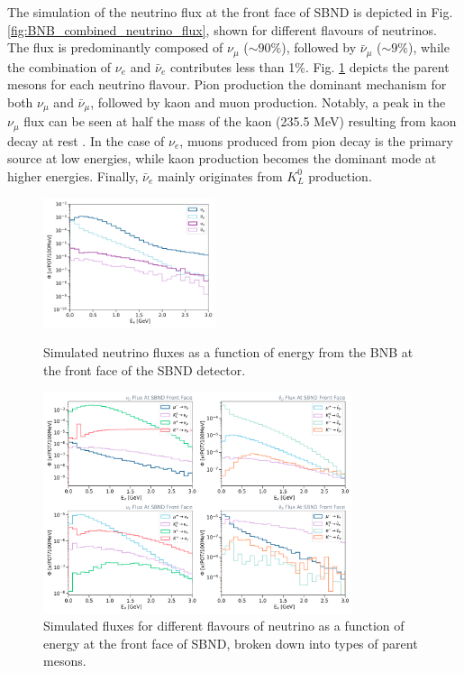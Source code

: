 The simulation of the neutrino flux at the front face of SBND is depicted in Fig. \ref{fig:BNB_combined_neutrino_flux}, shown for different flavours of neutrinos. 
The flux is predominantly composed of $\nu_{\mu}$ ($\sim90\%$), followed by $\bar{\nu}_{\mu}$ ($\sim9\%$), while the combination of $\nu_{e}$ and $\bar{\nu}_{e}$ contributes less than 1\%.
Fig. \ref{fig:BNB_neutrino_flux} depicts the parent mesons for each neutrino flavour.
Pion production the dominant mechanism for both $\nu_{\mu}$ and $\bar{\nu}_{\mu}$, followed by kaon and muon production. 
Notably, a peak in the $\nu_{\mu}$ flux can be seen at half the mass of the kaon (235.5 MeV) resulting from kaon decay at rest \cite{kaonDecayNu}.
In the case of $\nu_{e}$, muons produced from pion decay is the primary source at low energies, while kaon production becomes the dominant mode at higher energies. 
Finally, $\bar{\nu}_{e}$ mainly originates from $K^{0}_{L}$ production.

\begin{figure}[hp] 
\centering    
\includegraphics[width=0.45\textwidth]{BNB_combined_neutrino_flux}
\caption[BNB_combined_neutrino_flux]{
Simulated neutrino fluxes as a function of energy from the BNB at the front face of the SBND detector. 
}
\label{fig:BNB_combined_neutrino_flux}
\centering    
\includegraphics[width=0.81\textwidth]{BNB_neutrino_flux}
\caption[BNB_neutrino_flux]{
Simulated fluxes for different flavours of neutrino as a function of energy at the front face of SBND, broken down into types of parent mesons.
}
\label{fig:BNB_neutrino_flux}
\end{figure}

